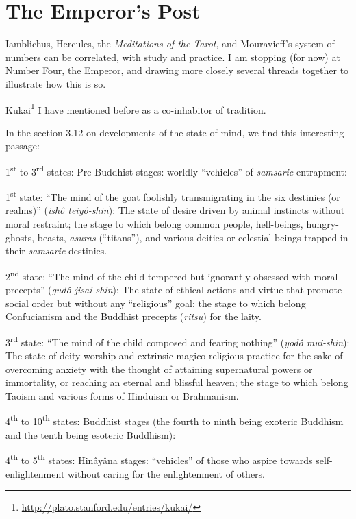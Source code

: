 \section{The Emperor’s Post}

Iamblichus, Hercules, the \emph{Meditations of the Tarot}, and Mouravieff's system of numbers can be correlated, with study and practice. I am stopping (for now) at Number Four, the Emperor, and drawing more closely several threads together to illustrate how this is so.

Kukai\footnote{\url{http://plato.stanford.edu/entries/kukai/}} I have mentioned before as a co-inhabitor of tradition.

In the section 3.12 on developments of the state of mind, we find this interesting passage:

\begin{quotationx}
1\textsuperscript{st} to 3\textsuperscript{rd} states: Pre-Buddhist stages: worldly ``vehicles'' of \emph{samsaric} entrapment:

1\textsuperscript{st} state: ``The mind of the goat foolishly transmigrating in the six destinies (or realms)'' (\emph{ishô teiyô-shin}): The state of desire driven by animal instincts without moral restraint; the stage to which belong common people, hell-beings, hungry-ghosts, beasts, \emph{asuras} (``titans''), and various deities or celestial beings trapped in their \emph{samsaric} destinies.

2\textsuperscript{nd} state: ``The mind of the child tempered but ignorantly obsessed with moral precepts'' (\emph{gudô jisai-shin}): The state of ethical actions and virtue that promote social order but without any ``religious'' goal; the stage to which belong Confucianism and the Buddhist precepts (\emph{ritsu}) for the laity.

3\textsuperscript{rd} state: ``The mind of the child composed and fearing nothing'' (\emph{yodô mui-shin}): The state of deity worship and extrinsic magico-religious practice for the sake of overcoming anxiety with the thought of attaining supernatural powers or immortality, or reaching an eternal and blissful heaven; the stage to which belong Taoism and various forms of Hinduism or Brahmanism.

4\textsuperscript{th} to 10\textsuperscript{th} states: Buddhist stages (the fourth to ninth being exoteric Buddhism and the tenth being esoteric Buddhism):

4\textsuperscript{th} to 5\textsuperscript{th} states: Hinâyâna stages: ``vehicles'' of those who aspire towards self-enlightenment without caring for the enlightenment of others.


\end{quotationx}
